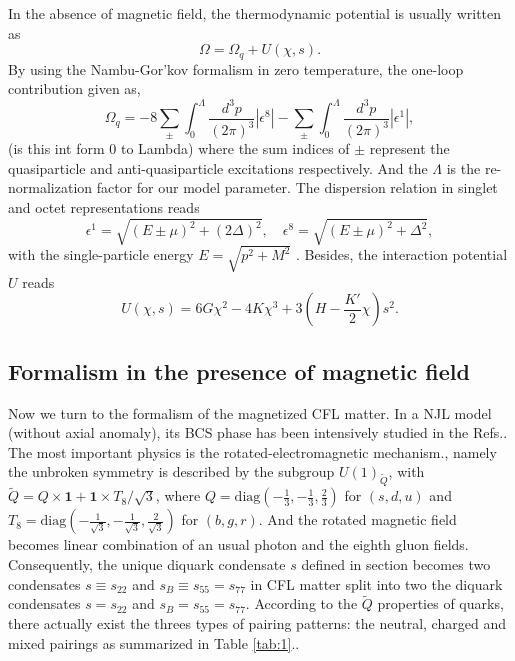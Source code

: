 \documentclass[prd, showpacs,nofootinbib,amsmath,amssymb,12pt]{revtex4}
\begin{document}
In the absence of magnetic field, the thermodynamic potential is usually written as 
\begin{equation}
\Omega=\Omega_q+U(\chi,s).
\end{equation}
By using the Nambu-Gor'kov formalism in zero temperature, 
the one-loop contribution given as\cite{abuki2010nambu},
\begin{equation}
\Omega_q=-8\sum_{\pm}\int^{\Lambda}_0\frac{d^3p}{(2\pi)^3}|\epsilon^8|
-\sum_{\pm}\int^{\Lambda}_0\frac{d^3p}{(2\pi)^3}|\epsilon^1|,
\label{oneloopinzero}
\end{equation}
(is this int form 0 to Lambda) where the sum indices of $\pm$ represent the quasiparticle and anti-quasiparticle excitations respectively.  
And the $\Lambda$ is the re-normalization factor for our model parameter.
The dispersion relation in singlet and octet representations reads
\begin{equation}
\epsilon^1=\sqrt{(E\pm\mu)^2+(2\Delta)^2},\quad
\epsilon^8=\sqrt{(E\pm\mu)^2+\Delta^2},
\label{despersionzerofield}
\end{equation}
with the single-particle energy $E=\sqrt{p^2+M^2}$ .
Besides, the interaction potential $U$ reads
\begin{equation}
U(\chi,s) = 6G\chi^2 - 4K\chi^3 + 3(H-\frac{K'}{2}\chi)s^2.
\label{potentialterm}
\end{equation}

\subsection{Formalism in the presence of magnetic field}
Now we turn to the formalism of the magnetized CFL matter. 
In a NJL model (without axial anomaly), 
its BCS phase has been intensively studied in the Refs.\cite{ferrer2005magnetic,Fukushima2008Color,Ferrer2006Color}.
The most important physics is the rotated-electromagnetic mechanism.\cite{alford1998qcd},
namely the unbroken symmetry is described by the subgroup $U(1)_{\widetilde{Q}}$,
with $\widetilde{Q}=Q\times\bm{1}+\bm{1}\times T_8/\sqrt{3}$, 
where $Q=\text{diag}(-\frac{1}{3},-\frac{1}{3},\frac{2}{3})$ for $(s,d,u)$ and $T_8=\text{diag}(-\frac{1}{\sqrt{3}},-\frac{1}{\sqrt{3}},\frac{2}{\sqrt{3}})$ for $(b,g,r)$.
And the rotated magnetic field becomes linear combination of an usual photon and the eighth gluon fields.
Consequently, the unique diquark condensate $s$ defined in section becomes two condensates $s\equiv s_{22}$ and $s_B\equiv s_{55}=s_{77}$
in CFL matter split into two the diquark condensates $s=s_{22}$ and $s_B=s_{55}=s_{77}$.
According to the $\widetilde{Q}$ properties of quarks, there actually exist the threes types of pairing patterns:
the neutral, charged and mixed pairings as summarized in Table \ref{tab:1}.\cite{ferrer2005magnetic}.
\end{document}
